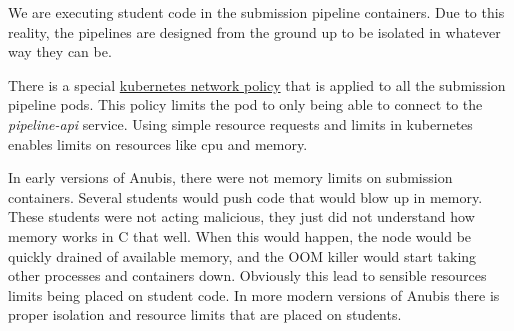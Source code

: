 We are executing student code in the submission pipeline containers.
Due to this reality, the pipelines are designed from the ground
up to be isolated in whatever way they can be.

There is a special
\href{https://kubernetes.io/docs/concepts/services-networking/network-policies/}{kubernetes network policy}
that is applied to  all the submission pipeline pods.
This policy limits the pod to only being able to connect to the \textit{pipeline-api} service.
Using simple resource requests and limits in kubernetes enables
limits on resources like cpu and memory.

In early versions of Anubis, there were not memory limits on submission
containers. 
Several students would push code that would blow up in memory. 
These students were not acting malicious, they just did not understand
how memory works in C that well.
When this would happen, the node would be quickly drained of available memory,
and the OOM killer would start taking other processes and containers down.
Obviously this lead to sensible resources limits being placed
on student code. In more modern versions of Anubis there is proper isolation and
resource limits that are placed on students.


